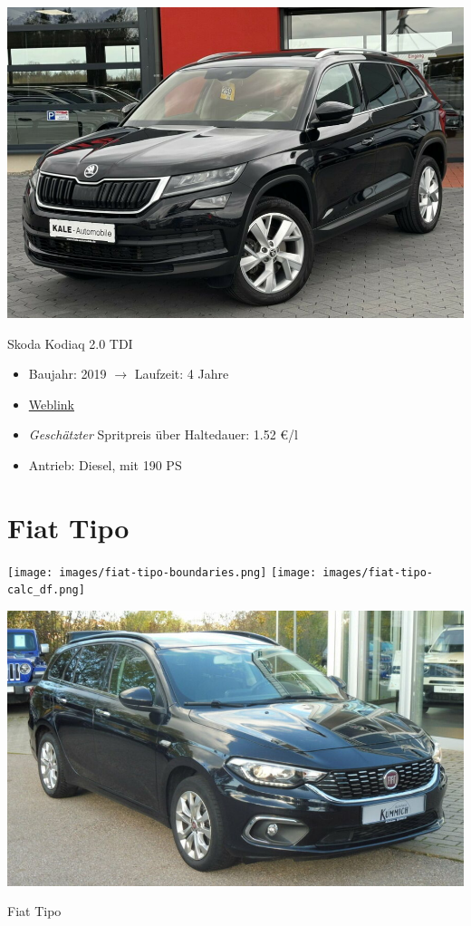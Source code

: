 \documentclass[landscape, DIV=99, 14pt]{scrartcl}
\begin{document}
\pagebreak
\null
\vspace{2cm}
\begin{center}
\includegraphics[width=0.9\columnwidth]{cars/skoda-kodiaq-2p0-tdi.png}

Skoda Kodiaq 2.0 TDI
\end{center}

\begin{itemize}
    \item Baujahr: 2019 $\rightarrow$ Laufzeit: 4 Jahre
    \item \href{https://suchen.mobile.de/fahrzeuge/details.html?id=319879014}{Weblink}
    \item \emph{Gesch\"atzter} Spritpreis \"uber Haltedauer: 1.52 \euro{}/l
    \item Antrieb: Diesel, mit 190 PS
\end{itemize}

\pagebreak


\twocolumn

\section*{Fiat Tipo}
\begin{center}
\texttt{[image: images/fiat-tipo-boundaries.png]}
\null
\vspace{0.5cm}
\texttt{[image: images/fiat-tipo-calc\_df.png]}
\end{center}

\pagebreak
\null
\vspace{2cm}
\begin{center}
\includegraphics[width=0.9\columnwidth]{cars/fiat-tipo.png}

Fiat Tipo
\end{center}
\end{document}
